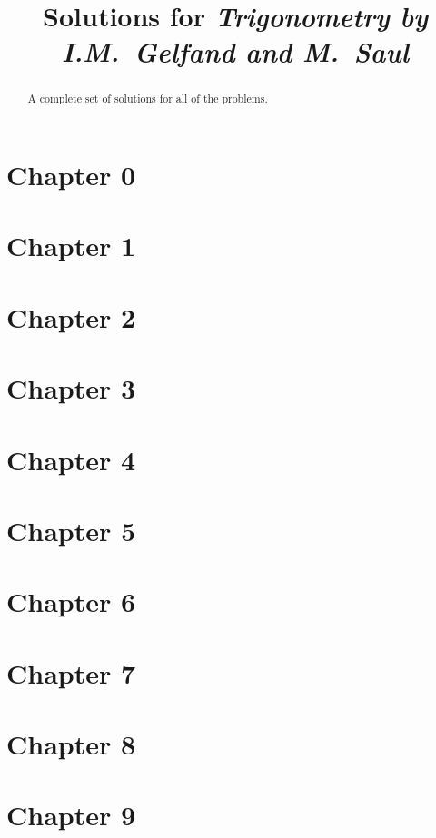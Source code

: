 \documentclass{article}
\title{Solutions for \it{Trigonometry} by I.M.~Gelfand and M.~Saul}
\author{}
\begin{document}
\maketitle

\begin{abstract}
A complete set of solutions for all of the problems.
\end{abstract}

\section*{Chapter 0}


\section*{Chapter 1}


\section*{Chapter 2}


\section*{Chapter 3}


\section*{Chapter 4}


\section*{Chapter 5}


\section*{Chapter 6}


\section*{Chapter 7}


\section*{Chapter 8}


\section*{Chapter 9}
\end{document}
